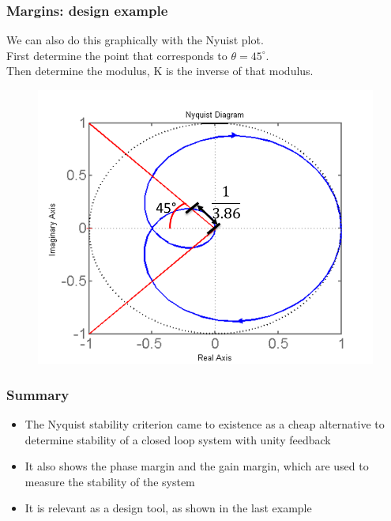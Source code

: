 \begin{frame}
	\frametitle{Margins: design example}
	We can also do this graphically with the Nyuist plot.\\
	\medskip
	First determine the point that corresponds to $\theta = 45^{\circ}$.\\
	Then determine the modulus, K is the inverse of that modulus.
	\vspace{-2ex}
	\begin{figure}
		\includegraphics[width=0.6\linewidth]{design_example}
	\end{figure}
\end{frame}

\begin{frame}
	\frametitle{Summary}
	\vspace{-10ex}
	\begin{itemize}
		\item The Nyquist stability criterion came to existence as a cheap alternative to determine stability of a closed loop system with unity feedback
		\item It also shows the phase margin and the gain margin, which are used to measure the stability of the system
		\item It is relevant as a design tool, as shown in the last example
	\end{itemize}
\end{frame}
